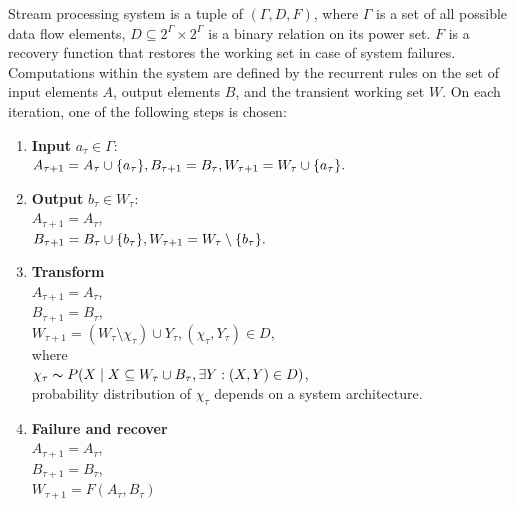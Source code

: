 \begin{definition}{Stream processing system}
\label{reference_system}
is a tuple of $(\Gamma,D,F)$, where $\Gamma$ is a set of all possible data flow elements, $D\subseteq{2^{\Gamma}\times2^{\Gamma}}$ is a binary relation on its power set. $F$ is a recovery function that restores the working set in case of system failures. Computations within the system are defined by the recurrent rules on the set of input elements $A$, output elements $B$, and the transient working set $W$. On each iteration, one of the following steps is chosen:

\begin{enumerate}
    \item \textbf{Input} $a_\tau\in{\Gamma}$:\\ $A_{\tau+1}=A_\tau \cup \{a_\tau\}, \\ B_{\tau+1}=B_{\tau}, \\ W_{\tau+1}=W_{\tau} \cup \{a_\tau\}.$
    \item \textbf{Output} $b_\tau\in{W_\tau}$:\\ $A_{\tau + 1} = A_{\tau}$, \\ $B_{\tau+1}=B_\tau \cup \{b_\tau\}, \\ W_{\tau+1}=W_{\tau} \setminus \{b_\tau\}.$
    \item \textbf{Transform}\\ $A_{\tau + 1} = A_{\tau}$,\\ $B_{\tau+1}=B_{\tau}$, \\ $W_{\tau+1}=(W_\tau \setminus \chi_\tau) \cup Y_\tau, (\chi_\tau,Y_\tau) \in D$, \\where\\$\chi_\tau \thicksim P(X\mid X \subseteq W_\tau \cup B_\tau , \exists Y : (X,Y) \in D)$, \\ probability distribution of $\chi_\tau$ depends on a system architecture. \label{random_formula}
    \item \textbf{Failure and recover} \\  $A_{\tau + 1} = A_{\tau}$,\\ $B_{\tau+1}=B_{\tau}$, \\ $W_{\tau+1} = F(A_\tau,B_\tau)$
\end{enumerate}

\end{definition}

